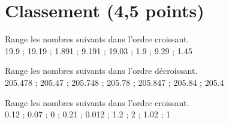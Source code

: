 \section{Classement (4,5 points)}

\begin{questions}
	\question[1\half] Range les nombres suivants dans l'ordre croissant. \\
	\num{19.9} \hspace{0.2cm} ; \hspace{0.2cm} \num{19.19} ; \num{1.891} \hspace{0.2cm} ; \hspace{0.2cm} \num{9.191} \hspace{0.2cm} ; \hspace{0.2cm} \num{19.03} \hspace{0.2cm} ; \hspace{0.2cm} \num{1.9} \hspace{0.2cm} ; \hspace{0.2cm} \num{9.29} \hspace{0.2cm} ; \hspace{0.2cm} \num{1.45}
	
	\question[1\half] Range les nombres suivants dans l'ordre décroissant. \\
	\num{205.478} \hspace{0.2cm} ; \hspace{0.2cm} \num{205.47} \hspace{0.2cm} ; \hspace{0.2cm} \num{205.748} \hspace{0.2cm} ; \hspace{0.2cm} \num{205.78} \hspace{0.2cm} ; \hspace{0.2cm} \num{205.847} \hspace{0.2cm} ; \hspace{0.2cm} \num{205.84} \hspace{0.2cm} ; \hspace{0.2cm} \num{205.4}
	
	\question[1\half] Range les nombres suivants dans l'ordre croissant. \\
	\num{0.12} \hspace{0.2cm};\hspace{0.2cm} \num{0.07} \hspace{0.2cm};\hspace{0.2cm} \num{0} \hspace{0.2cm};\hspace{0.2cm} \num{0.21} \hspace{0.2cm};\hspace{0.2cm} \num{0.012} \hspace{0.2cm};\hspace{0.2cm} \num{1.2} \hspace{0.2cm};\hspace{0.2cm} 2 \hspace{0.2cm};\hspace{0.2cm}  \num{1.02} \hspace{0.2cm};\hspace{0.2cm} \num{1}
\end{questions}